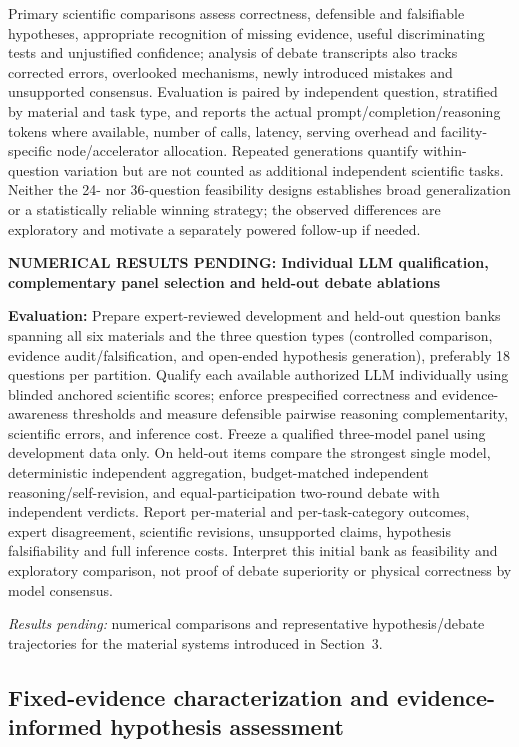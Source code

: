 \documentclass[11pt,a4paper]{article}
\newcommand{\newexperiment}[2]{\par\medskip\noindent\begingroup\color{red!80!black}\textbf{NUMERICAL RESULTS PENDING: #1}\par\noindent\textbf{Evaluation:} #2\par\endgroup\medskip}
\begin{document}
Primary scientific comparisons assess correctness, defensible and falsifiable hypotheses, appropriate recognition of missing evidence, useful discriminating tests and unjustified confidence; analysis of debate transcripts also tracks corrected errors, overlooked mechanisms, newly introduced mistakes and unsupported consensus. Evaluation is paired by independent question, stratified by material and task type, and reports the actual prompt/completion/reasoning tokens where available, number of calls, latency, serving overhead and facility-specific node/accelerator allocation. Repeated generations quantify within-question variation but are not counted as additional independent scientific tasks. Neither the 24- nor 36-question feasibility designs establishes broad generalization or a statistically reliable winning strategy; the observed differences are exploratory and motivate a separately powered follow-up if needed.

\newexperiment{Individual LLM qualification, complementary panel selection and held-out debate ablations}{Prepare expert-reviewed development and held-out question banks spanning all six materials and the three question types (controlled comparison, evidence audit/falsification, and open-ended hypothesis generation), preferably 18 questions per partition. Qualify each available authorized LLM individually using blinded anchored scientific scores; enforce prespecified correctness and evidence-awareness thresholds and measure defensible pairwise reasoning complementarity, scientific errors, and inference cost. Freeze a qualified three-model panel using development data only. On held-out items compare the strongest single model, deterministic independent aggregation, budget-matched independent reasoning/self-revision, and equal-participation two-round debate with independent verdicts. Report per-material and per-task-category outcomes, expert disagreement, scientific revisions, unsupported claims, hypothesis falsifiability and full inference costs. Interpret this initial bank as feasibility and exploratory comparison, not proof of debate superiority or physical correctness by model consensus.}

\textcolor{red!80!black}{\emph{Results pending:} numerical comparisons and representative hypothesis/debate trajectories for the material systems introduced in Section~3.}

\subsection{Fixed-evidence characterization and evidence-informed hypothesis assessment}
\end{document}

